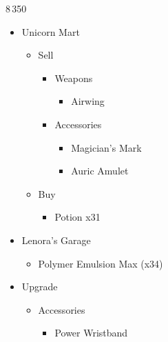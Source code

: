 \begin{multicols}{2}
	\renewcommand{\first}{[1] Slash \& Burn (\com/\rav)}
	\renewcommand{\second}{[2] Tide Turner (\syn/\sab)}
	\renewcommand{\third}{[3] Divide \& Conquer (\com/\sab)}
	\renewcommand{\fourth}{[4] Dualcasting (\rav/\rav)}

	\begin{shop}{8\,350}
		\begin{itemize}
			\item Unicorn Mart
			      \begin{itemize}
				      \item Sell
				            \begin{itemize}
					            \item Weapons
					                  \begin{itemize}
						                  \item Airwing
					                  \end{itemize}
					            \item Accessories
					                  \begin{itemize}
						                  \item Magician's Mark
						                  \item Auric Amulet
					                  \end{itemize}
				            \end{itemize}
				      \item Buy
				            \begin{itemize}
					            \item Potion x31
				            \end{itemize}
			      \end{itemize}
			\item Lenora's Garage
			      \begin{itemize}
				      \item Polymer Emulsion Max (x34)
			      \end{itemize}
		\end{itemize}
	\end{shop}
	\begin{upgrade}
		\begin{itemize}
			\item Upgrade
			      \begin{itemize}
				      \item Accessories
				            \begin{itemize}
					            \item Power Wristband
					                  \begin{itemize}

\end{itemize}
\end{itemize}
\end{itemize}
\end{itemize}
\end{upgrade}
\end{multicols}
